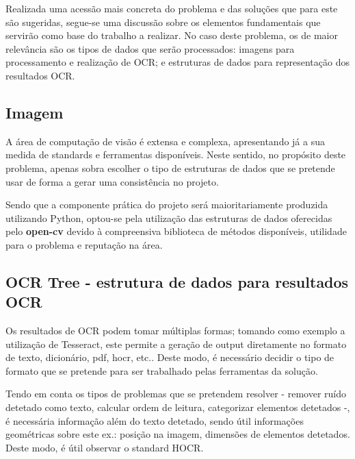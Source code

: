 Realizada uma acessão mais concreta do problema e das soluções que para este são sugeridas, segue-se uma discussão sobre os elementos fundamentais que servirão como base do trabalho a realizar. No caso deste problema, os de maior relevância são os tipos de dados que serão processados: imagens para processamento e realização de OCR; e estruturas de dados para representação dos resultados OCR.

\subsection{Imagem}

A área de computação de visão é extensa e complexa, apresentando já a sua medida de standards e ferramentas disponíveis. Neste sentido, no propósito deste problema, apenas sobra escolher o tipo de estruturas de dados que se pretende usar de forma a gerar uma consistência no projeto.

Sendo que a componente prática do projeto será maioritariamente produzida utilizando Python, optou-se pela utilização das estruturas de dados oferecidas pelo \textbf{open-cv} devido à compreensiva biblioteca de métodos disponíveis, utilidade para o problema e reputação na área.

\subsection{OCR Tree - estrutura de dados para resultados OCR}

Os resultados de OCR podem tomar múltiplas formas; tomando como exemplo a utilização de Tesseract, este permite a geração de output diretamente no formato de texto, dicionário, pdf, hocr, etc.. Deste modo, é necessário decidir o tipo de formato que se pretende para ser trabalhado pelas ferramentas da solução.

Tendo em conta os tipos de problemas que se pretendem resolver - remover ruído detetado como texto, calcular ordem de leitura, categorizar elementos detetados -, é necessária informação além do texto detetado, sendo útil informações geométricas sobre este ex.: posição na imagem, dimensões de elementos detetados. Deste modo, é útil observar o standard HOCR.

